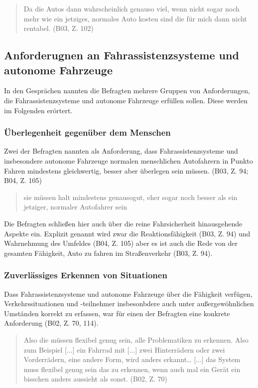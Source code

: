 \documentclass[12pt]{article}
\begin{document}
\begin{quote}
  Da die Autos dann wahrscheinlich genauso viel, wenn nicht sogar noch mehr wie ein jetziges, normales Auto kosten sind die für mich dann nicht rentabel. (B03, Z. 102)
\end{quote}


\subsection{Anforderugnen an Fahrassistenzsysteme und autonome Fahrzeuge}
In den Gesprächen nannten die Befragten mehrere Gruppen von Anforderungen, die Fahrassistenzsysteme und autonome Fahrzeuge erfüllen sollen. Diese werden im Folgenden erörtert.

\subsubsection*{Überlegenheit gegenüber dem Menschen}
Zwei der Befragten nannten als Anforderung, dass Fahrassistenzsysteme und insbesondere autonome Fahrzeuge normalen menschlichen Autofahrern in Punkto Fahren mindestens gleichwertig, besser aber überlegen sein müssen. (B03, Z. 94; B04, Z. 105)

\begin{quote}
  sie müssen halt mindestens genausogut, eher sogar noch besser als ein jetziger, normaler Autofahrer sein
\end{quote}

Die Befragten schließen hier auch über die reine Fahrsicherheit hinausgehende Aspekte ein. Explizit genannt wird zwar die Reaktionsfähigkeit (B03, Z. 94) und Wahrnehmung des Umfeldes (B04, Z. 105) aber es ist auch die Rede von \glqq der gesamten Fähigkeit, Auto zu fahren im Straßenverkehr\grqq{} (B03, Z. 94).

\subsubsection*{Zuverlässiges Erkennen von Situationen}
Dass Fahrassistenzsysteme und autonome Fahrzeuge über die Fähigkeit verfügen, Verkehrssituationen und -teilnehmer insbesonbdere auch unter außergewöhnlichen Umständen korrekt zu erfassen, war für einen der Befragten eine konkrete Anforderung (B02, Z. 70, 114).

\begin{quote}
  Also die müssen flexibel genug sein, alle Problematiken zu erkennen. Also zum Beispiel [...] ein Fahrrad mit [...] zwei Hinterrädern oder zwei Vorderrädern, eine andere Form, wird anders erkannt… [...] das System muss flexibel genug sein das zu erkennen, wenn auch mal ein Gerät ein bisschen anders aussieht als sonst. (B02, Z. 70)
\end{quote}
\end{document}
